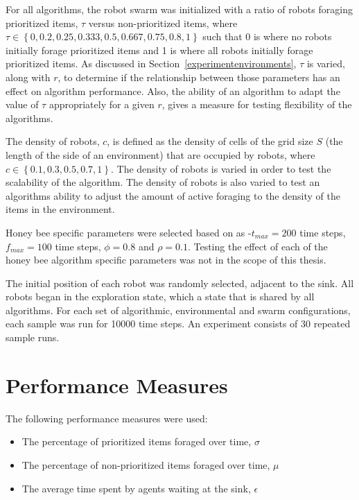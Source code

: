 For all algorithms, the robot swarm was initialized with 
a ratio of robots foraging prioritized items, $\tau$ versus non-prioritized items, where $\tau\in\left\{0, 0.2, 0.25, 0.333, 0.5, 0.667, 0.75, 0.8,1\right\}$ such that 0 is where no robots initially forage prioritized items and 1 is where all robots initially forage prioritized items. As discussed in Section~\ref{experimentenvironments}, $\tau$ is varied, along with $r$, to determine if the relationship between those parameters has an effect on algorithm performance. Also, the ability of an algorithm to adapt the value of $\tau$ appropriately for a given $r$, gives a measure for testing flexibility of the algorithms.

The density of robots, $c$, is defined as the density of cells of the grid size $S$ (the length of the side of an environment) that are occupied by robots, where $c\in\left\{0.1, 0.3, 0.5, 0.7, 1\right\}$. The density of robots is varied in order to test the scalability of the algorithm. The density of robots is also varied to test an algorithms ability to adjust the amount of active foraging to the density of the items in the environment.

Honey bee specific parameters were selected based on \cite{seeley2009wisdom} as
-$t_{max}=200$ time steps, $f_{max}=100$ time steps, $\phi=0.8$ and $\rho=0.1$. Testing the effect of each of the honey bee algorithm specific parameters was not in the scope of this thesis.

The initial position of each robot was randomly selected, adjacent to the sink. All robots began in the exploration state, which a state that is shared by all algorithms. For each set of algorithmic, environmental and swarm configurations, each sample was run for 10000 time steps. An experiment consists of 30 repeated sample runs.

\section{Performance Measures}
\label{thri:third:performancemeasures}

The following performance measures were used: 

	\begin{itemize}
		\item	The percentage of prioritized items foraged over time,  $\sigma$ 
		\item	The percentage of non-prioritized items foraged over time, $\mu$
		\item   The average time spent by agents waiting at the sink, $\epsilon$
	\end{itemize}
	

